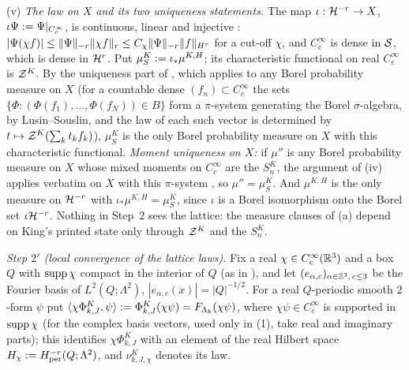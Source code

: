 (v) \emph{The law on $X$ and its two uniqueness statements.} The map $\iota:\mathcal H^{-r}\to X$, $\iota\Psi:=\Psi|_{C^\infty_c}$, is continuous, linear and injective \cite[Lemma~10.5(b)]{SymPhase}: $|\Psi(\chi f)|\le\lVert \Psi\rVert_{-r}\lVert \chi f\rVert_r\le C_\chi\lVert \Psi\rVert_{-r}\lVert f\rVert_{H^r}$ for a cut-off $\chi$, and $C^\infty_c$ is dense in $\mathcal S$, which is dense in $\mathcal H^r$. Put $\mu^K_S:=\iota_*\mu^{K,H}$; its characteristic functional on real $C^\infty_c$ is $\mathcal Z^K$. By the uniqueness part of \cite[Lemma~10.3]{SymPhase}, which applies to any Borel probability measure on $X$ (for a countable dense $(f_n)\subset C^\infty_c$ the sets $\{\Phi:(\Phi(f_1),\dots,\Phi(f_N))\in B\}$ form a $\pi$-system generating the Borel $\sigma$-algebra, by Lusin--Souslin, and the law of each such vector is determined by $t\mapsto\mathcal Z^K(\sum_kt_kf_k)$), $\mu^K_S$ is the only Borel probability measure on $X$ with this characteristic functional. \emph{Moment uniqueness on $X$:} if $\mu''$ is any Borel probability measure on $X$ whose mixed moments on $C^\infty_c$ are the $S^K_n$, the argument of (iv) applies verbatim on $X$ with this $\pi$-system \cite[Prop.~10.4]{SymPhase}, so $\mu''=\mu^K_S$. And $\mu^{K,H}$ is the only measure on $\mathcal H^{-r}$ with $\iota_*\mu^{K,H}=\mu^K_S$, since $\iota$ is a Borel isomorphism onto the Borel set $\iota\mathcal H^{-r}$. Nothing in Step~2 sees the lattice: the measure clauses of (a) depend on King's printed state only through $\mathcal Z^K$ and the $S^K_n$.

\emph{Step $2'$ (local convergence of the lattice laws).} Fix a real $\chi\in C^\infty_c(\mathbb R^3)$ and a box $Q$ with $\operatorname{supp}\chi$ compact in the interior of $Q$ (as in \cite[Prop.~8.3]{SymPhase}), and let $(e_{\alpha,c})_{\alpha\in\mathbb Z^3,\,c\le3}$ be the Fourier basis of $L^2(Q;\Lambda^2)$, $|e_{\alpha,c}(x)|=|Q|^{-1/2}$. For a real $Q$-periodic smooth $2$-form $\psi$ put $\langle \chi\Phi^K_{k,J},\psi\rangle:=\Phi^K_{k,J}(\chi\psi)=F_{\Lambda_k}(\chi\psi)$, where $\chi\psi\in C^\infty_c$ is supported in $\operatorname{supp}\chi$ (for the complex basis vectors, used only in (1), take real and imaginary parts); this identifies $\chi\Phi^K_{k,J}$ with an element of the real Hilbert space $H_\chi:= H^{-r}_{\mathrm{per}}(Q;\Lambda^2)$, and $\nu^K_{k,J,\chi}$ denotes its law.

